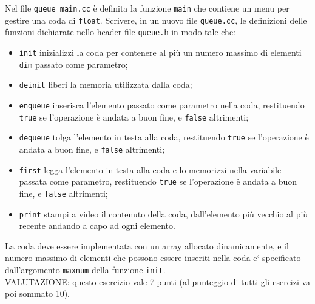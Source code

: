 Nel file {\tt queue\_main.cc} \`e definita la funzione {\tt main} che
contiene un menu per gestire una coda di {\tt float}. 
Scrivere, in un nuovo file {\tt queue.cc}, 
le definizioni delle funzioni dichiarate nello header file \texttt{queue.h} 
in modo tale che:
\begin{itemize}
\item
\texttt{init} inizializzi la coda per contenere al pi\`u un numero massimo di elementi
{\tt dim} passato come parametro;
\item 
\texttt{deinit} liberi la memoria utilizzata dalla coda;
\item
\texttt{enqueue} inserisca l'elemento passato come parametro nella coda,
restituendo {\tt true} se l'operazione \`e andata a buon fine, 
e {\tt false} altrimenti;
\item
\texttt{dequeue} tolga l'elemento in testa alla coda,
restituendo {\tt true} se l'operazione \`e andata a buon fine, 
e {\tt false} altrimenti;
\item
\texttt{first} legga l'elemento in testa alla coda e lo memorizzi nella
variabile passata come parametro,
restituendo {\tt true} se l'operazione \`e andata a buon fine,
e {\tt false} altrimenti;
\item
\texttt{print} stampi a video il contenuto della coda, dall'elemento
pi\`u vecchio al pi\`u recente andando a capo ad ogni elemento.
\end{itemize}

La coda deve essere implementata con un array allocato dinamicamente, e il numero
massimo di elementi che possono essere inseriti nella coda e` specificato
dall'argomento {\tt maxnum} della funzione {\tt init}.\\


VALUTAZIONE:
questo esercizio vale 7 punti 
(al punteggio di tutti gli esercizi va poi sommato 10).
